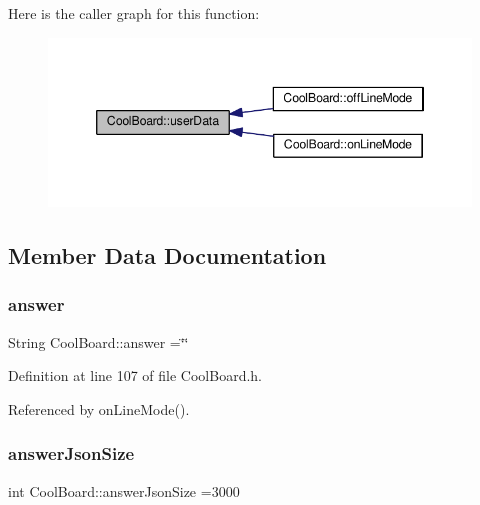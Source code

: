 Here is the caller graph for this function\+:
\nopagebreak
\begin{figure}[H]
\begin{center}
\leavevmode
\includegraphics[width=346pt]{classCoolBoard_ae7358fb6e623cfc81b775f5f1734909b_icgraph}
\end{center}
\end{figure}


\subsection{Member Data Documentation}
\mbox{\label{classCoolBoard_a7b835fafd449e5282f7f91d787a2dc15}} 
\subsubsection{\texorpdfstring{answer}{answer}}
{\footnotesize\ttfamily String Cool\+Board\+::answer =\char`\"{}\char`\"{}\hspace{0.3cm}{\ttfamily [private]}}



Definition at line 107 of file Cool\+Board.\+h.



Referenced by on\+Line\+Mode().

\mbox{\label{classCoolBoard_af2da1f85315b3d074a8b87d158094fb7}} 
\subsubsection{\texorpdfstring{answer\+Json\+Size}{answerJsonSize}}
{\footnotesize\ttfamily int Cool\+Board\+::answer\+Json\+Size =3000\hspace{0.3cm}{\ttfamily [private]}}



